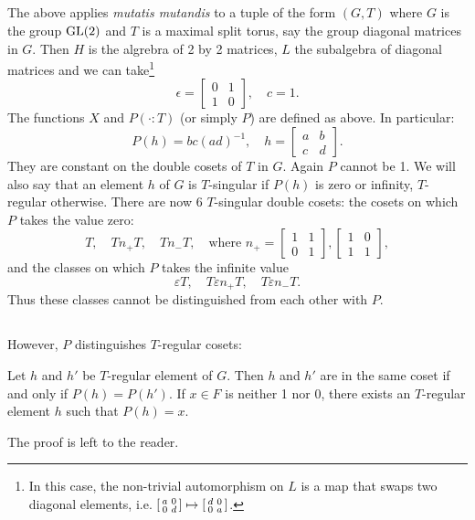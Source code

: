 \subsection{}
The above applies \emph{mutatis mutandis} to a tuple of the form $(G, T)$ where $G$ is the group $\mathrm{GL}(2)$ and $T$ is a maximal split torus, say the group diagonal matrices in $G$.
Then $H$ is the algrebra of 2 by 2 matrices, $L$ the subalgebra of diagonal matrices and we can take\footnote{In this case, the non-trivial automorphism on $L$ is a map that swaps two diagonal elements, i.e. $[\begin{smallmatrix} a & 0 \\ 0 & d \end{smallmatrix}]\mapsto [\begin{smallmatrix} d & 0 \\ 0 & a \end{smallmatrix}]$.}
\[
\epsilon = \begin{bmatrix}
    0 & 1 \\ 1 & 0
\end{bmatrix},
\quad c = 1.
\]
The functions $X$ and $P(\cdot :T)$ (or simply $P$) are defined as above.
In particular:
\[
P(h)  = bc{(ad)}^{-1}, \quad h = \begin{bmatrix}
    a & b \\ c & d
\end{bmatrix}.
\]
They are constant on the double cosets of $T$ in $G$.
Again $P$ cannot be 1.
We will also say that an element $h$ of $G$ is $T$-singular if $P(h)$ is zero or infinity, $T$-regular otherwise.
There are now 6 $T$-singular double cosets: the cosets on which $P$ takes the value zero:
\begin{equation}
    T, \quad Tn_+T, \quad Tn_{-}T, \quad \text{where } n_{+} = \begin{bmatrix}
        1 & 1 \\ 0 & 1
    \end{bmatrix},  \begin{bmatrix}
        1 & 0 \\ 1 & 1
    \end{bmatrix},
\end{equation}
and the classes on which $P$ takes the infinite value
\begin{equation}
\varepsilon T, \quad T \varepsilon n_{+} T, \quad T\varepsilon n_{-} T.
\end{equation}
Thus these classes cannot be distinguished from each other with $P$.

\subsection{}
However, $P$ distinguishes $T$-regular cosets:
\begin{proposition}
Let $h$ and $h'$ be $T$-regular element of $G$.
Then $h$ and $h'$ are in the same coset if and only if $P(h) = P(h')$.
If $x \in F$ is neither 1 nor 0, there exists an $T$-regular element $h$ such that $P(h) = x$.
\end{proposition}
The proof is left to the reader.